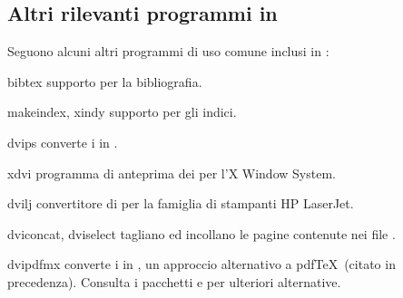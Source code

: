 \documentclass{article}
\begin{document}
\subsection{Altri rilevanti programmi in \protect\TL}

Seguono alcuni altri programmi di uso comune inclusi in \TL{}:

\begin{cmddescription}

\item [bibtex] supporto per la bibliografia.

\item [makeindex, xindy] supporto per gli indici.

\item [dvips] converte i \dvi{} in \PS{}.

\item [xdvi] programma di anteprima dei \dvi{} per l'X Window System.

\item [dvilj] convertitore di \dvi{} per la famiglia di stampanti HP
LaserJet.

\item [dviconcat, dviselect] tagliano ed incollano le pagine contenute nei
file \dvi{}.

\item [dvipdfmx] converte i \dvi{} in , un approccio alternativo
a pdf\TeX\ (citato in precedenza). Consulta i pacchetti  e
 per ulteriori alternative.


\end{cmddescription}
\end{document}
